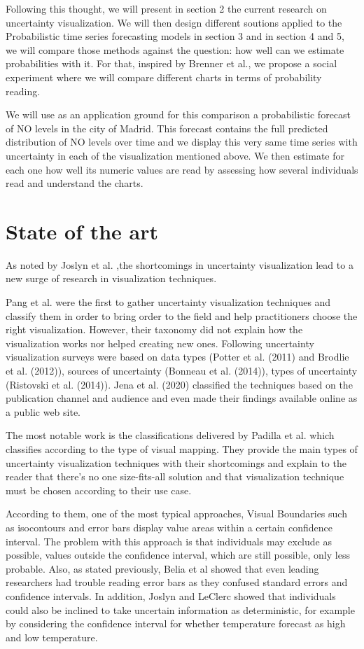 \documentclass[a4paper,3p,sort&compress]{elsarticle}
\begin{document}
Following this thought, we will present in section 2 the current research on uncertainty visualization. We will then
design different soutions applied to the Probabilistic time series forecasting models in section 3 and in section 4 and 5,
we will compare those methods against the question: how well can we estimate probabilities with it. 
For that, inspired by Brenner et al., we propose a social experiment where we will compare different charts 
in terms of probability reading. 

We will use as an application ground for this comparison a probabilistic forecast of NO levels 
in the city of Madrid. This forecast contains the full predicted distribution of NO levels over time
and we display this very same time series with uncertainty in each of the visualization mentioned above. 
We then estimate for each one how well its numeric values are read by assessing how several individuals read 
and understand the charts.

\section{State of the art}
\label{sec:results}

As noted by Joslyn et al. \cite{joslyn_communicating_2010},the shortcomings in uncertainty visualization lead to a new surge of 
research in visualization techniques. 

Pang et al. were the first to gather uncertainty visualization techniques and classify them in order to bring order to the field and help 
practitioners choose the right visualization. However, their taxonomy did not explain how the visualization works nor helped creating new 
ones. Following uncertainty visualization surveys were based on data types (Potter et al. (2011) and Brodlie et al. (2012)), 
sources of uncertainty (Bonneau et al. (2014)), types of uncertainty (Ristovski et al. (2014)). Jena et al. (2020) classified the techniques 
based on the publication channel and audience and even made their findings available online as a 
public web site. 

The most notable work is the classifications delivered by Padilla et al. which classifies according to 
the type of visual mapping. They provide the main types of uncertainty visualization techniques with their shortcomings and 
explain to the reader that there's no one size-fits-all solution and that visualization technique must be chosen according to their use case.

According to them, one of the most typical approaches, Visual Boundaries such as isocontours and error 
bars display value areas within a certain confidence interval. The problem with this approach is 
that individuals may exclude as possible, values outside the confidence interval, which are still 
possible, only less probable. Also, as stated previously, Belia et al \cite{belia_researchers_2005} showed that even leading researchers had 
trouble reading error bars as they confused 
standard errors and confidence intervals. In addition, Joslyn and LeClerc showed that individuals could also be inclined to take uncertain 
information as deterministic, for example by considering the confidence interval for whether temperature 
forecast as high and low temperature. 
\end{document}
